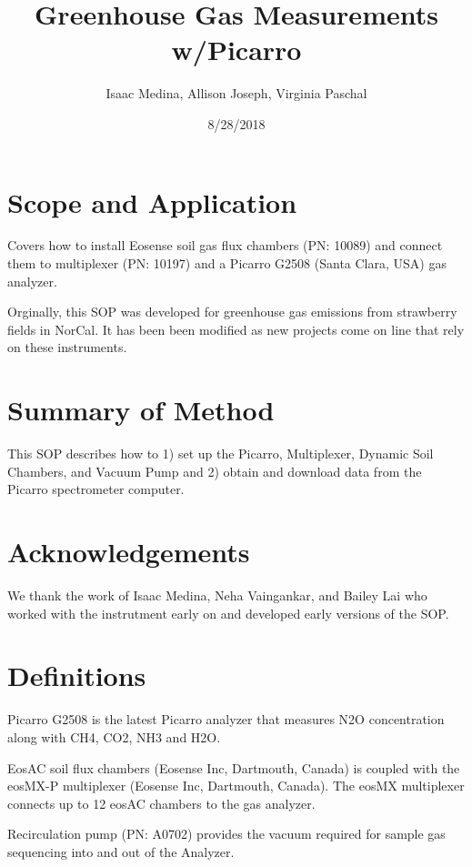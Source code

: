\documentclass[12pt]{../SOP3}\usepackage[]{graphicx}\usepackage[]{color}
\title{Greenhouse Gas Measurements w/Picarro}
\date{8/28/2018}
\author{Isaac Medina, Allison Joseph, Virginia Paschal}
\begin{document}
\maketitle

\section{Scope and Application}

\NP Covers how to install Eosense soil gas flux chambers (PN: 10089) and connect them to multiplexer (PN: 10197) and a Picarro G2508 (Santa Clara, USA) gas analyzer.

\NP Orginally, this SOP was developed for greenhouse gas emissions from strawberry fields in NorCal. It has been been modified as new projects come on line that rely on these instruments. 

\section{Summary of Method}

\NP This SOP describes how to 1) set up the Picarro, Multiplexer, Dynamic Soil Chambers, and Vacuum Pump and 2) obtain and download data from the Picarro spectrometer computer.

\tableofcontents

\newpage

\section{Acknowledgements}

We thank the work of Isaac Medina, Neha Vaingankar, and Bailey Lai who worked with the instrutment early on and developed early versions of the SOP. 

\section{Definitions}

\NP Picarro G2508 is the latest Picarro analyzer that measures N2O concentration along with CH4, CO2, NH3 and H2O. 

  
\NP EosAC soil flux chambers (Eosense Inc, Dartmouth, Canada) is coupled with
the eosMX-P multiplexer (Eosense Inc, Dartmouth, Canada). The eosMX multiplexer connects up to 12 eosAC chambers to the gas analyzer. 

\NP Recirculation pump (PN: A0702) provides the vacuum required for sample gas sequencing into and out of the Analyzer. 
\end{document}
